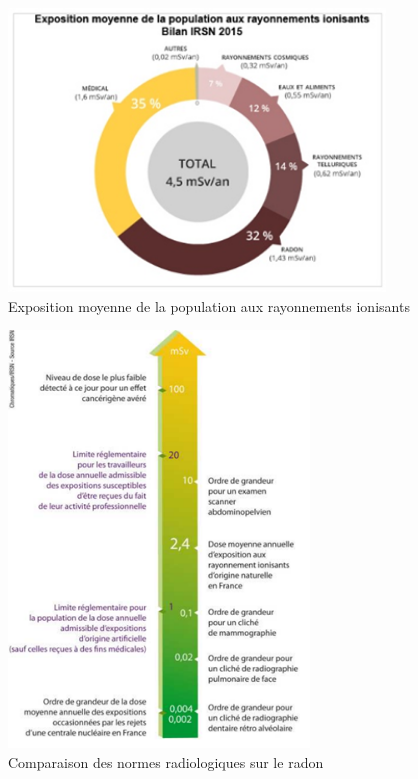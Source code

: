\documentclass{article}
\begin{document}
\begin{figure}[H]
    \centering
    \includegraphics[width=10cm]{II_A2_4.png}
    \caption{Exposition moyenne de la population aux rayonnements ionisants}
    \label{fig:exposition_moyenne}
\end{figure}

\begin{figure}[H]
    \centering
    \includegraphics[width=8cm]{II_A2_5.png}
    \caption{Comparaison des normes radiologiques sur le radon}
    \label{fig:comparaison_normes}
\end{figure}
\end{document}
